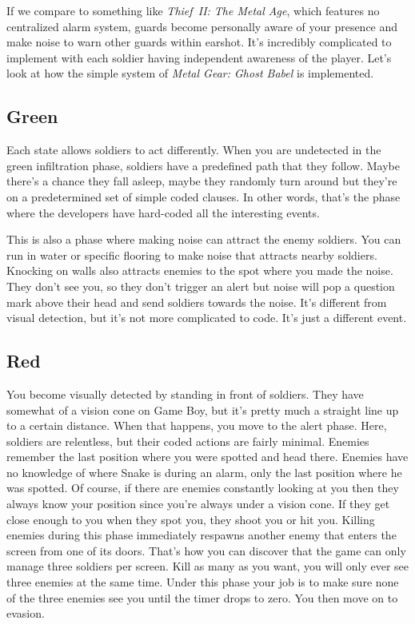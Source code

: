 \documentclass{book}
\begin{document}
If we compare to something like \emph{Thief~II: The Metal Age}, which features no centralized alarm system, guards become personally aware of your presence and make noise to warn other guards within earshot. It’s incredibly complicated to implement with each soldier having independent awareness of the player. Let’s look at how the simple system of \emph{Metal Gear: Ghost Babel} is implemented.

\subsection*{Green}\nopagebreak[4]

Each state allows soldiers to act differently. When you are undetected in the green infiltration phase, soldiers have a predefined path that they follow. Maybe there’s a chance they fall asleep, maybe they randomly turn around but they’re on a predetermined set of simple coded clauses. In other words, that’s the phase where the developers have hard-coded all the interesting events.

This is also a phase where making noise can attract the enemy soldiers. You can run in water or specific flooring to make noise that attracts nearby soldiers. Knocking on walls also attracts enemies to the spot where you made the noise. They don’t see you, so they don’t trigger an alert but noise will pop a question mark above their head and send soldiers towards the noise. It’s different from visual detection, but it’s not more complicated to code. It’s just a different event.

\subsection*{Red}\nopagebreak[4]

You become visually detected by standing in front of soldiers. They have somewhat of a vision cone on Game Boy, but it’s pretty much a straight line up to a certain distance. When that happens, you move to the alert phase. Here, soldiers are relentless, but their coded actions are fairly minimal. Enemies remember the last position where you were spotted and head there. Enemies have no knowledge of where Snake is during an alarm, only the last position where he was spotted. Of course, if there are enemies constantly looking at you then they always know your position since you’re always under a vision cone. If they get close enough to you when they spot you, they shoot you or hit you. Killing enemies during this phase immediately respawns another enemy that enters the screen from one of its doors. That’s how you can discover that the game can only manage three soldiers per screen. Kill as many as you want, you will only ever see three enemies at the same time. Under this phase your job is to make sure none of the three enemies see you until the timer drops to zero. You then move on to evasion.
\end{document}
